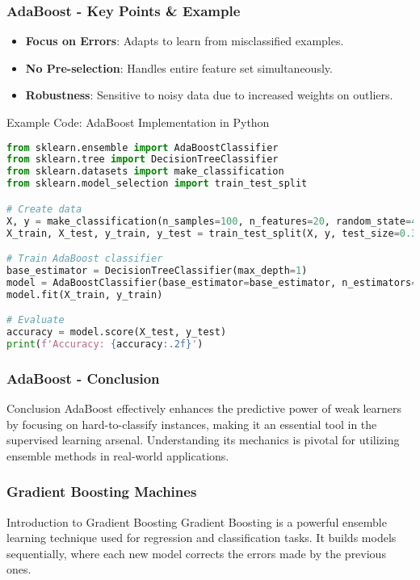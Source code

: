 \documentclass[aspectratio=169]{beamer}
\begin{document}
\begin{frame}[fragile]
    \frametitle{AdaBoost - Key Points & Example}
    \begin{itemize}
        \item \textbf{Focus on Errors}: Adapts to learn from misclassified examples.
        \item \textbf{No Pre-selection}: Handles entire feature set simultaneously.
        \item \textbf{Robustness}: Sensitive to noisy data due to increased weights on outliers.
    \end{itemize}

    \begin{block}{Example Code: AdaBoost Implementation in Python}
    \begin{lstlisting}[language=Python]
from sklearn.ensemble import AdaBoostClassifier
from sklearn.tree import DecisionTreeClassifier
from sklearn.datasets import make_classification
from sklearn.model_selection import train_test_split

# Create data
X, y = make_classification(n_samples=100, n_features=20, random_state=42)
X_train, X_test, y_train, y_test = train_test_split(X, y, test_size=0.3)

# Train AdaBoost classifier
base_estimator = DecisionTreeClassifier(max_depth=1)
model = AdaBoostClassifier(base_estimator=base_estimator, n_estimators=50)
model.fit(X_train, y_train)

# Evaluate
accuracy = model.score(X_test, y_test)
print(f'Accuracy: {accuracy:.2f}')
    \end{lstlisting}
    \end{block}
\end{frame}

\begin{frame}[fragile]
    \frametitle{AdaBoost - Conclusion}
    \begin{block}{Conclusion}
        AdaBoost effectively enhances the predictive power of weak learners by focusing on hard-to-classify instances, making it an essential tool in the supervised learning arsenal. Understanding its mechanics is pivotal for utilizing ensemble methods in real-world applications.
    \end{block}
\end{frame}

\begin{frame}[fragile]
    \frametitle{Gradient Boosting Machines}
    \begin{block}{Introduction to Gradient Boosting}
        Gradient Boosting is a powerful ensemble learning technique used for regression and classification tasks.
        It builds models sequentially, where each new model corrects the errors made by the previous ones.
    \end{block}
\end{frame}
\end{document}

